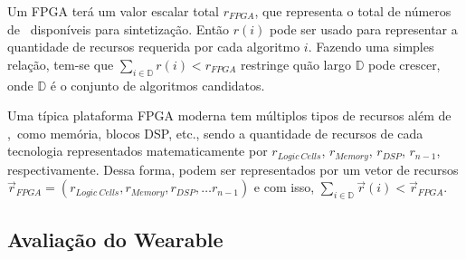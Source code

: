             Um FPGA terá um valor escalar total $ r_{FPGA} $, que representa o total de números de \luts\ disponíveis para sintetização.
            Então $ r(i) $ pode ser usado para representar a quantidade de recursos requerida por cada algoritmo $ i $.
            Fazendo uma simples relação, tem-se que $ \sum_{i \in \mathbb{D}} r(i) < r_{FPGA} $ restringe quão largo $ \mathbb{D} $ pode crescer, onde $ \mathbb{D} $ é o conjunto de algoritmos candidatos.
            
            Uma típica plataforma FPGA moderna tem múltiplos tipos de recursos além de \luts,\ como memória, blocos DSP, etc., sendo a quantidade de recursos de cada tecnologia representados matematicamente por  $r_{Logic\ Cells}$, $r_{Memory}$, $r_{DSP}$, $r_{n-1} $, respectivamente.
            Dessa forma, podem ser representados por um vetor de recursos
            $ \vec{r}_{FPGA} = (r_{Logic\ Cells}, r_{Memory}, r_{DSP}, \dots r_{n-1} ) $
            e com isso,
            $\sum_{i \in \mathbb{D}} \vec{r}(i) < \vec{r}_{FPGA}$.
    
    
    \subsection{Avaliação do Wearable}
        
